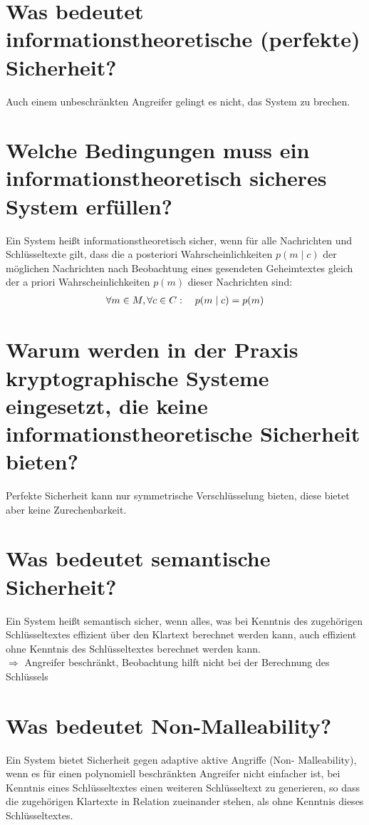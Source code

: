 \documentclass{article}
\begin{document}
	\section*{Was bedeutet informationstheoretische (perfekte) Sicherheit?}
	Auch einem unbeschränkten Angreifer gelingt es nicht, das System zu brechen.
	
	\section*{Welche Bedingungen muss ein informationstheoretisch sicheres System erfüllen?}
	Ein System heißt informationstheoretisch sicher, wenn für alle Nachrichten und Schlüsseltexte gilt, dass die a posteriori Wahrscheinlichkeiten $p(m\mid c)$ der möglichen Nachrichten nach Beobachtung eines gesendeten Geheimtextes gleich der a priori Wahrscheinlichkeiten $p(m)$ dieser Nachrichten sind:
	\begin{align}
		\forall m\in M, \forall c\in C:\quad p(m\mid c)=p(m) \notag
	\end{align}
	
	\section*{Warum werden in der Praxis kryptographische Systeme eingesetzt, die keine informationstheoretische Sicherheit bieten?}
	Perfekte Sicherheit kann nur symmetrische Verschlüsselung bieten, diese bietet aber keine Zurechenbarkeit.

	\section*{Was bedeutet semantische Sicherheit?}
	Ein System heißt semantisch sicher, wenn alles, was bei Kenntnis des zugehörigen Schlüsseltextes effizient über den Klartext berechnet werden kann, auch effizient ohne Kenntnis des Schlüsseltextes berechnet werden kann. \\
	$\Rightarrow$ Angreifer beschränkt, Beobachtung hilft nicht bei der Berechnung des Schlüssels
	
	\section*{Was bedeutet Non-Malleability?}
	Ein System bietet Sicherheit gegen adaptive aktive Angriffe (Non- Malleability), wenn es für einen polynomiell beschränkten Angreifer nicht einfacher ist, bei Kenntnis eines Schlüsseltextes einen weiteren Schlüsseltext zu generieren, so dass die zugehörigen Klartexte in Relation zueinander stehen, als ohne Kenntnis dieses Schlüsseltextes.
\end{document}
